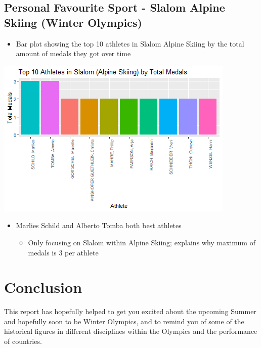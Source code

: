 \documentclass[11pt,preprint, authoryear]{elsarticle}
\let\origfigure\figure
\let\endorigfigure\endfigure
\renewenvironment{figure}[1][2] {
    \expandafter\origfigure\expandafter[H]
} {
    \endorigfigure
}
\numberwithin{equation}{section}
\numberwithin{figure}{section}
\numberwithin{table}{section}
\def\tightlist{} %
\begin{document}
\hypertarget{personal-favourite-sport---slalom-alpine-skiing-winter-olympics}{%
\subsection{Personal Favourite Sport - Slalom Alpine Skiing (Winter
Olympics)}\label{personal-favourite-sport---slalom-alpine-skiing-winter-olympics}}

\begin{itemize}
\tightlist
\item
  Bar plot showing the top 10 athletes in Slalom Alpine Skiing by the
  total amount of medals they got over time
\end{itemize}

\begin{figure}[H]

{\centering \includegraphics{Question4_files/figure-latex/Figure6-1} 

}

\caption{Top Athletes Slalom \label{Figure6}}\label{fig:Figure6}
\end{figure}

\begin{itemize}
\tightlist
\item
  Marlies Schild and Alberto Tomba both best athletes

  \begin{itemize}
  \tightlist
  \item
    Only focusing on Slalom within Alpine Skiing; explains why maximum
    of medals is 3 per athlete
  \end{itemize}
\end{itemize}

\hypertarget{conclusion}{%
\section{Conclusion}\label{conclusion}}

This report has hopefully helped to get you excited about the upcoming
Summer and hopefully soon to be Winter Olympics, and to remind you of
some of the historical figures in different disciplines within the
Olympics and the performance of countries.


\end{document}
